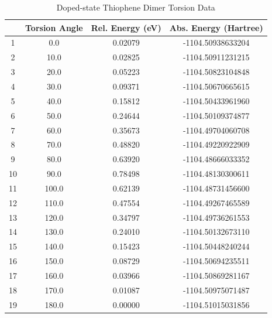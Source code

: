 \begin{table}[hbt!]\centering
\caption{Doped-state Thiophene Dimer Torsion Data}
\renewcommand{\arraystretch}{1.5}
\begin{threeparttable}
\begin{tabular}{cccc}\toprule
  {} & {Torsion Angle} & {Rel. Energy (eV)} & {Abs. Energy (Hartree)} \\ \midrule
    1 & 0.0 & 0.02079 & -1104.50938633204\\
    2 & 10.0 & 0.02825 & -1104.50911231215\\
    3 & 20.0 & 0.05223 & -1104.50823104848\\
    4 & 30.0 & 0.09371 & -1104.50670665615\\ \midrule
    5 & 40.0 & 0.15812 & -1104.50433961960\\
    6 & 50.0 & 0.24644 & -1104.50109374877\\
    7 & 60.0 & 0.35673 & -1104.49704060708\\
    8 & 70.0 & 0.48820 & -1104.49220922909\\ \midrule
    9 & 80.0 & 0.63920 & -1104.48666033352\\
    10 & 90.0 & 0.78498 & -1104.48130300611\\
    11 & 100.0 & 0.62139 & -1104.48731456600\\
    12 & 110.0 & 0.47554 & -1104.49267465589\\ \midrule
    13 & 120.0 & 0.34797 & -1104.49736261553\\
    14 & 130.0 & 0.24010 & -1104.50132673110\\
    15 & 140.0 & 0.15423 & -1104.50448240244\\
    16 & 150.0 & 0.08729 & -1104.50694235511\\ \midrule
    17 & 160.0 & 0.03966 & -1104.50869281167\\
    18 & 170.0 & 0.01087 & -1104.50975071487\\
    19 & 180.0 & 0.00000 & -1104.51015031856\\ \bottomrule
\end{tabular}
\begin{tablenotes}
\item
\end{tablenotes}
\end{threeparttable}
\end{table}

